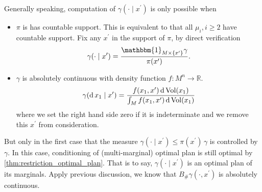 Generally speaking, computation of $\gamma(\cdot \mid x^\prime)$ is only possible when
\begin{itemize}
	\item $\pi$ is has countable support.
	      This is equivalent to that all $\mu_i, i \geq 2$ have countable support.
	      Fix any $x^\prime$ in the support of $\pi$, by direct verification
	      \[
		      \gamma(\cdot \mid x^\prime) =
		      \frac{
			      \mathbbm{1}_{M \times \{x^\prime\}}
			      \gamma
		      }{\pi(x^\prime)}.
	      \]
	\item $\gamma$ is absolutely continuous with density function $f: M^n \rightarrow \mathbb{R} $.
	      \[
		      \gamma(\operatorname{d} x_1 \mid x^\prime) =
		      \frac{
			      f(x_1, x^\prime) \operatorname{d} \operatorname{Vol}(x_1)
		      }
		      {\int_{M} f(x_1, x^\prime) \operatorname{d} \operatorname{Vol}(x_1)
		      }
	      \]
	      where we set the right hand side zero if it is indeterminate
	      and we remove this $x^\prime$ from consideration.
\end{itemize}
But only in the first case that the measure $\gamma(\cdot \mid x^\prime) \leq \pi(x^\prime) \, \gamma$
is controlled by $\gamma$.
In this case, conditioning of (multi-marginal) optimal plan is still optimal by \cref{thm:restriction_optimal_plan}.
That is to say, $\gamma(\cdot \mid x^\prime)$ is an optimal plan of its marginals.
Apply previous discussion, we know that $B_{\#}\gamma(\cdot, x^\prime)$
is absolutely continuous.
